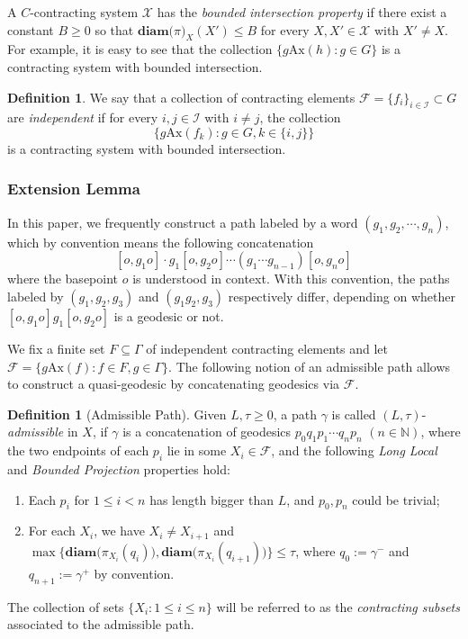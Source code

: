 \documentclass{amsart}
\numberwithin{thm}{section}
\numberwithin{figure}{section}
\theoremstyle{definition}
\theoremstyle{definition}
\newtheorem{defn}[thm]{Definition}
\theoremstyle{remark}
\newcommand{\U}{X}
\newcommand{\f}{\mathscr F}
\newcommand{\ax}{\mathrm{Ax}}
\newcommand{\diam }[1]{{\textbf{diam}\big(#1\big)}}
\numberwithin{equation}{section}
\theoremstyle{plain}
\begin{document}
A $C$-contracting system $\mathcal{X}$ has the \emph{bounded intersection property} if there exist a constant $B \geq 0$ so that $\diam \pi_{X}(X') \leq B$ for every $X,X' \in \mathcal{X}$ with $X' \neq X$.
For example, it is easy to see that the collection $\{ g \ax(h) : g \in G\}$ is a contracting system with bounded intersection.
\begin{defn}
We say that a collection of contracting elements $\mathcal{F} = \{ f_i \}_{i \in \mathcal{I}} \subset G$ are \emph{independent} if 
for every $i, j \in \mathcal{I}$ with $i \neq j$, the collection 
\[
\{ g\ax(f_k) : g \in G, k\in \{i,j \}\}
\]
is a contracting system with bounded intersection.
\end{defn}

\subsubsection{Extension Lemma}
    In this paper, we frequently construct a path labeled by a word $(g_1, g_2,\cdots,g_n)$, which by convention means the following concatenation
$$
[o,g_1o]\cdot g_1[o,g_2o]\cdots (g_1\cdots g_{n-1})[o,g_no]
$$
where the basepoint $o$ is understood in context. With this convention, the paths labeled by $(g_1,g_2,g_3)$ and $(g_1g_2, g_3)$ respectively differ, depending on whether  $[o,g_1o]g_1[o,g_2o]$ is a geodesic or not.

{We fix a finite set $F \subseteq \Gamma$ of independent contracting elements and let $\f = \{g \ax(f) : f \in F, g \in \Gamma\}$.} The following notion of an admissible path allows     to construct   a quasi-geodesic  by concatenating geodesics via $\f$.

\begin{defn}[Admissible Path]\label{AdmDef} Given $L,\tau\geq0$, a path $\gamma$ is called $(L,\tau)$-\textit{admissible} in $\U$, if $\gamma$ is a concatenation of geodesics $p_0q_1p_1\cdots q_np_n$ $(n\in\mathbb{N})$, where the two endpoints of each $p_i$ lie in some $X_i\in \f$, and   the following   \textit{Long Local} and \textit{Bounded Projection} properties hold:
\begin{enumerate}
\item[(LL)] Each $p_i$  for $1\le i< n$ has length bigger than $L$, and  $p_0,p_n$ could be trivial;
\item[(BP)] For each $X_i$, we have $X_i\ne X_{i+1}$ and $\max\{\diam{\pi_{X_i}(q_i)},\diam{\pi_{X_i}(q_{i+1})}\}\leq\tau$, where $q_0:=\gamma^-$ and $q_{n+1}:=\gamma^+$ by convention.
\end{enumerate} 
The collection of sets $\{X_i: 1\le i\le n\}$ will be referred to as the \emph{ contracting subsets} associated to the admissible path.
\end{defn}
\end{document}
